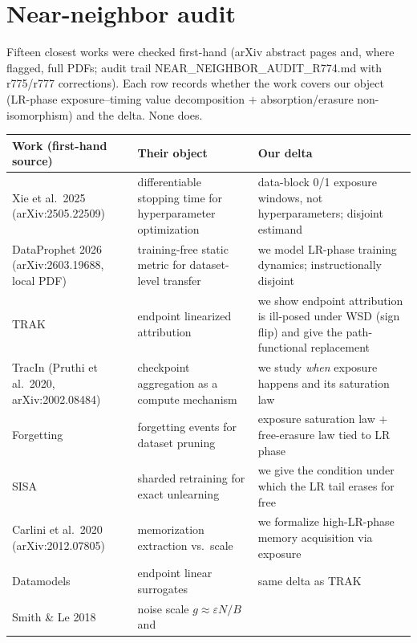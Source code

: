 \documentclass{article}
\begin{document}





\appendix
\section{Near-neighbor audit}
\label{app:neighbors}
Fifteen closest works were checked first-hand (arXiv abstract pages and, where flagged, full
PDFs; audit trail NEAR\_NEIGHBOR\_AUDIT\_R774.md with r775/r777 corrections). Each row records
whether the work covers our object (LR-phase exposure--timing value decomposition $+$
absorption/erasure non-isomorphism) and the delta. None does.

\begin{center}
\small
\begin{tabular}{@{}p{}p{}p{}@{}}
\toprule
Work (first-hand source) & Their object & Our delta \\
\midrule
Xie et al.\ 2025 (arXiv:2505.22509) & differentiable stopping time for hyperparameter
optimization & data-block 0/1 exposure windows, not hyperparameters; disjoint estimand \\
DataProphet 2026 (arXiv:2603.19688, local PDF) & training-free static metric for
dataset-level transfer & we model LR-phase training dynamics; instructionally disjoint \\
TRAK \citep{park2023trak} & endpoint linearized attribution & we show endpoint attribution is
ill-posed under WSD (sign flip) and give the path-functional replacement \\
TracIn (Pruthi et al.\ 2020, arXiv:2002.08484) & checkpoint aggregation as a compute
mechanism & we study \emph{when} exposure happens and its saturation law \\
Forgetting \citep{toneva2019forgetting} & forgetting events for dataset pruning & exposure
saturation law $+$ free-erasure law tied to LR phase \\
SISA \citep{bourtoule2021sisa} & sharded retraining for exact unlearning & we give the
condition under which the LR tail erases for free \\
Carlini et al.\ 2020 (arXiv:2012.07805) & memorization extraction vs.\ scale & we formalize
high-LR-phase memory acquisition via exposure \\
Datamodels \citep{ilyas2022datamodels} & endpoint linear surrogates & same delta as TRAK \\
Smith \& Le 2018 \citep{smith2017bayesian} & noise scale $g\approx\varepsilon N/B$ and

\end{tabular}
\end{center}
\end{document}
